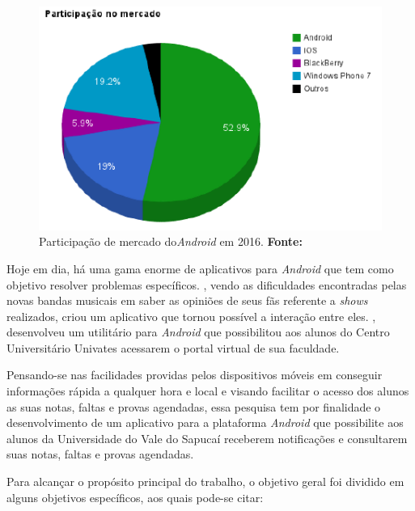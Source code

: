 	\begin{figure}[h!]
		\centerline{\includegraphics[scale=1]{./imagens/0_introducao/introducao.png}}
		\caption[Participação de mercado do \textit{Android} em 2016]{Participação de
		mercado do\textit{Android} em 2016.
		\textbf{Fonte:}}
		\label{fig:intro}
	\end{figure}

	\par Hoje em dia, há uma gama enorme de aplicativos para \textit{Android} que
tem como objetivo resolver problemas específicos. ,
vendo as dificuldades encontradas pelas novas bandas musicais em saber as
opiniões de seus fãs referente a \textit{shows} realizados, criou um aplicativo
que tornou possível a interação entre eles. , desenvolveu
um utilitário para \textit{Android} que possibilitou aos alunos do Centro
Universitário Univates acessarem o portal virtual de sua faculdade.


	\par Pensando-se nas facilidades providas pelos dispositivos móveis em
conseguir informações rápida a qualquer hora e local e visando facilitar o
acesso dos alunos as suas notas, faltas e provas agendadas, essa pesquisa tem
por finalidade o desenvolvimento de um aplicativo para a plataforma
\textit{Android} que possibilite aos alunos da Universidade do Vale do Sapucaí
receberem notificações e consultarem suas notas, faltas e provas agendadas.

	
	\par Para alcançar o propósito principal do trabalho, o objetivo geral foi
dividido em alguns objetivos específicos, aos quais pode-se citar:
	
